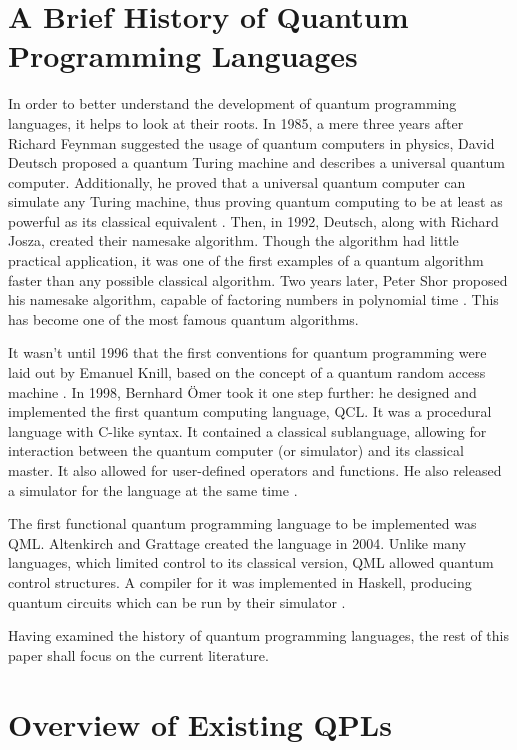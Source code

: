 \documentclass[]{article}
\begin{document}
\section{A Brief History of Quantum Programming Languages}
In order to better understand the development of quantum programming languages, it helps to look at their roots. In 1985, a mere three years after Richard Feynman suggested the usage of quantum computers in physics, David Deutsch proposed a quantum Turing machine and describes a universal quantum computer. Additionally, he proved that a universal quantum computer can simulate any Turing machine, thus proving quantum computing to be at least as powerful as its classical equivalent \cite{deutsch1985}. Then, in 1992, Deutsch, along with Richard Josza, created their namesake algorithm. Though the algorithm had little practical application, it was one of the first examples of a quantum algorithm faster than any possible classical algorithm. Two years later, Peter Shor proposed his namesake algorithm, capable of factoring numbers in polynomial time \cite{shor1995}. This has become one of the most famous quantum algorithms.

It wasn't until 1996 that the first conventions for quantum programming were laid out by Emanuel Knill, based on the concept of a quantum random access machine \cite{knill_1996}. In 1998, Bernhard \"Omer took it one step further: he designed and implemented the first quantum computing language, QCL. It was a procedural language with C-like syntax. It contained a classical sublanguage, allowing for interaction between the quantum computer (or simulator) and its classical master. It also allowed for user-defined operators and functions. He also released a simulator for the language at the same time \cite{omer1998}.

The first functional quantum programming language to be implemented was QML. Altenkirch and Grattage created the language in 2004. Unlike many languages, which limited control to its classical version, QML allowed quantum control structures. A compiler for it was implemented in Haskell, producing quantum circuits which can be run by their simulator \cite{altenkirch2004}.

Having examined the history of quantum programming languages, the rest of this paper shall focus on the current literature.

\section{Overview of Existing QPLs}
\end{document}
